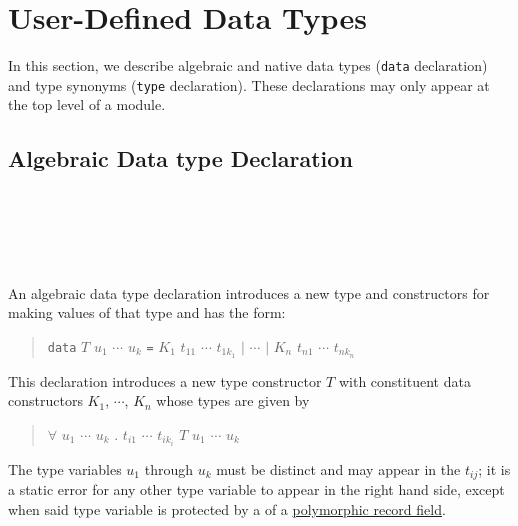 \section{User-Defined Data Types}   

In this section, we describe algebraic and native data types (\texttt{data} declaration) and type synonyms (\texttt{type} declaration). These declarations may only appear at the top level of a module.

\subsection{Algebraic Data type Declaration}   \label{algdcl}

\begin{flushleft}
     \sym{=}  \\
 \\
   
  \alt\    \bracea{} \bracez{}\\
 \\
\end{flushleft}

An algebraic data type declaration introduces a new type and constructors for making values of that type and has the form:
\begin{quote}
\texttt{data} $T$ $u_1$ $\cdots$ $u_k$ \texttt{=} $K_1$ $t_{11}$ $\cdots$ $t_{1k_1}$ $|$ $\cdots$ $|$ $K_n$ $t_{n1}$ $\cdots$ $t_{nk_n}$
\end{quote}

This declaration introduces a new type constructor $T$ with constituent data constructors $K_1$, $\cdots$, $K_n$ whose types are given by
\begin{quote}
$\forall$ $u_1$ $\cdots$ $u_k$ . $t_{i1}$ \arrow{} $\cdots$ \arrow{} $t_{ik_i}$ \arrow{} $T$ $u_1$ $\cdots$ $u_k$
\end{quote}

The type variables $u_1$ through $u_k$ must be distinct and may appear in the $t_{ij}$; it is a static error for any other type variable to appear in the right hand side, except when said type variable is protected by a  of a \hyperref[polyrf]{polymorphic record field}.

